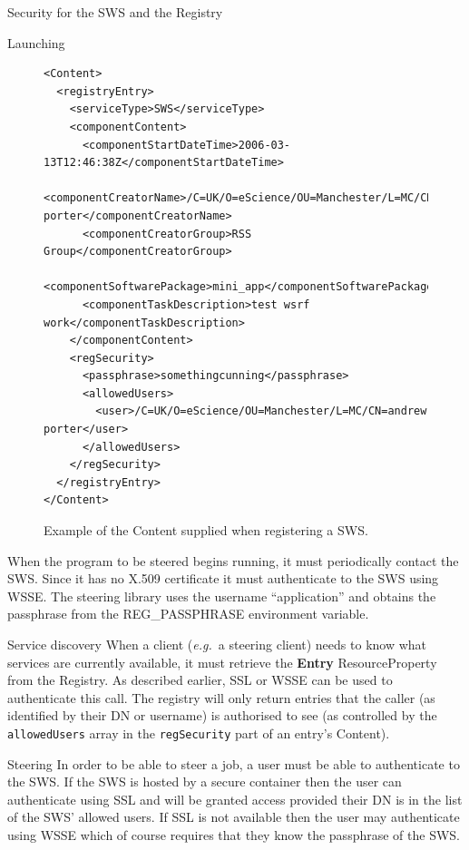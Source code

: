 \documentclass[a4paper]{article}
\begin{document}
\begin{section}{Security for the SWS and the Registry}
\begin{subsection}{Launching}
\begin{figure}
\begin{verbatim}
<Content>
  <registryEntry>
    <serviceType>SWS</serviceType>
    <componentContent>
      <componentStartDateTime>2006-03-13T12:46:38Z</componentStartDateTime>
      <componentCreatorName>/C=UK/O=eScience/OU=Manchester/L=MC/CN=andrew porter</componentCreatorName>
      <componentCreatorGroup>RSS Group</componentCreatorGroup>
      <componentSoftwarePackage>mini_app</componentSoftwarePackage>
      <componentTaskDescription>test wsrf work</componentTaskDescription>
    </componentContent>
    <regSecurity>
      <passphrase>somethingcunning</passphrase>
      <allowedUsers>
        <user>/C=UK/O=eScience/OU=Manchester/L=MC/CN=andrew porter</user>
      </allowedUsers>
    </regSecurity>
  </registryEntry>
</Content>
\end{verbatim}
\caption{Example of the Content supplied when registering a SWS.}
\label{fig:contentXML}
\end{figure}
When the program to be steered begins running, it must periodically contact the SWS.
Since it has no X.509 certificate it must authenticate to the SWS using WSSE.  The
steering library uses the username ``application'' and obtains the 
passphrase from the REG\_PASSPHRASE environment variable.

\end{subsection}

\begin{subsection}{Service discovery}
When a client ({\it e.g.}\ a steering client) needs to know what services
are currently available, it must retrieve the {\bf Entry} ResourceProperty
from the Registry.  As described earlier, SSL or WSSE can be used to authenticate
this call.  The registry will only return entries that the caller (as identified by
their DN or username) is authorised to see (as controlled by the 
\texttt{allowedUsers} array in the \texttt{regSecurity} part of an entry's Content).
\end{subsection}

\begin{subsection}{Steering}
In order to be able to steer a job, a user must be able to authenticate to the
SWS.  If the SWS is hosted by a secure container then the user can authenticate
using SSL and will be granted access provided their DN is in the list of the SWS' 
allowed users.  If SSL is not available then the user may authenticate using
WSSE which of course requires that they know the passphrase of the SWS.


\end{subsection}
\end{section}
\end{document}
